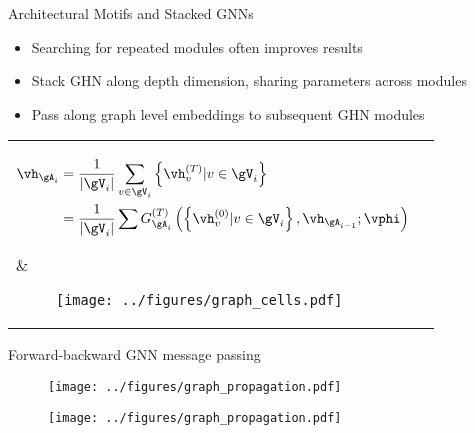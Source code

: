 \documentclass[final,t]{beamer}
\begin{document}
\begin{frame}{}
\begin{columns}[t]
\begin{column}{.47\linewidth}
  	\begin{exampleblock}{Architectural Motifs and Stacked GNNs}
  		\begin{itemize}
			\item Searching for repeated modules often improves results
			\item Stack GHN along depth dimension, sharing parameters across modules
			\item Pass along graph level embeddings to subsequent GHN modules
		\end{itemize}
	\vspace{0.8cm}
  	\begin{tabular}{p{}p{}}
  	\hspace{1cm}
  	\vspace{0.8cm}
	\parbox{1cm}{\small\begin{align*}
		\vh_{\gA_i} &= \frac{1}{|\gV_i|}\sum_{v\in \gV_i} \left\{\vh_v^{(T)} | v \in \gV_i \right\} \\
		                 &= \frac{1}{|\gV_i|}\sum G_{\gA_i}^{(T)}\left(\left\{\vh_v^{(0)} | v \in \gV_i \right\}, \vh_{\gA_{i-1}}; \vphi\right) %
		\end{align*}} &  	
  		\vspace{-1.6in}
	  	\begin{figure}
			\texttt{[image: ../figures/graph\_cells.pdf]}
		\end{figure}   
	\end{tabular}
	\vspace{-1in}
	\end{exampleblock}
	
  	\begin{exampleblock}{Forward-backward GNN message passing}
	\begin{figure}[t]
	\centering
	\begin{minipage}{.48\textwidth}
	  \centering
	  \texttt{[image: ../figures/graph\_propagation.pdf]}
	  \captionsetup{labelformat=empty}
	\label{table:Results4}
	  \label{fig:test1}
	\end{minipage}%
	\begin{minipage}{.48\textwidth}
	  \centering
	  \texttt{[image: ../figures/graph\_propagation.pdf]}
	  \captionsetup{labelformat=empty}
	  \label{fig:test2}
	\end{minipage}
	\end{figure}  	
  	

\end{exampleblock}
\end{column}
\end{columns}
\end{frame}
\end{document}
